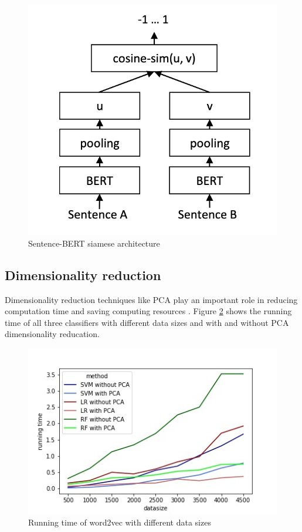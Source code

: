 \documentclass[12pt, a4paper, titlepage]{article}
\begin{document}
\begin{figure}[hb!]
  \center
  \includegraphics[scale=0.5]{SBERT.png}
  \caption{\label{fig: F5} Sentence-\ac{BERT} siamese architecture \citep[3]{reimers2019}}
\end{figure}

\subsection{Dimensionality reduction}
Dimensionality reduction techniques like \ac{PCA} play an important role in reducing computation time and saving computing resources \citep{ayesha2020}. Figure \ref{fig: F6} shows the running time of all three classifiers with different data sizes and with and without \ac{PCA} dimensionality reducation. 


\begin{figure}[hb!]
  \center
  \includegraphics[scale=0.5]{running_time_PCA.jpeg}
  \caption{\label{fig: F6} Running time of word2vec with different data sizes}
\end{figure}
\end{document}
